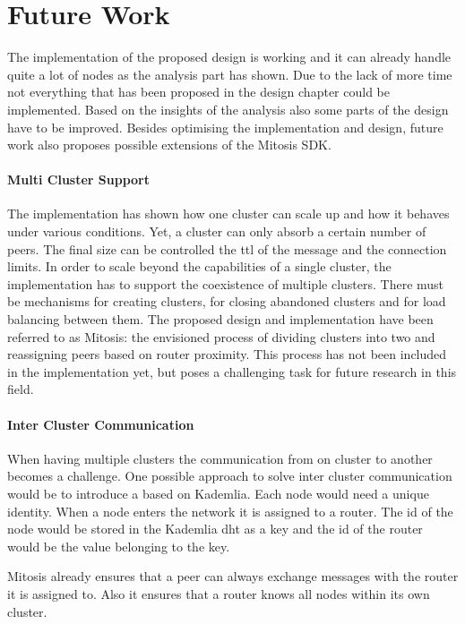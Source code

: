 \section{Future Work}
The implementation of the proposed design is working and it can already handle quite a lot of nodes as the analysis part has shown. Due to the lack of more time not everything that has been proposed in the design chapter could be implemented. Based on the insights of the analysis also some parts of the design have to be improved.
Besides optimising the implementation and design, future work also proposes possible extensions of the \gls{Mitosis} SDK.

\paragraph{Multi Cluster Support}
The implementation has shown how one cluster can scale up and how it behaves under various conditions. Yet, a cluster can only absorb a certain number of peers. The final size can be controlled the \gls{ttl} of the \routerAlive message and the connection limits. In order to scale beyond the capabilities of a single cluster, the implementation has to support the coexistence of multiple clusters. There must be mechanisms for creating clusters, for closing abandoned clusters and for load balancing between them. The proposed design and implementation have been referred to as \gls{Mitosis}: the envisioned process of dividing clusters into two and reassigning peers based on router proximity. This process has not been included in the implementation yet, but poses a challenging task for future research in this field.

\paragraph{Inter Cluster Communication}
When having multiple clusters the communication from on cluster to another becomes a challenge. One possible approach to solve inter cluster communication would be to introduce a  based on Kademlia. Each node would need a unique identity. When a node enters the network it is assigned to a router. The id of the node would be stored in the Kademlia \gls{dht} as a key and the id of the router would be the value belonging to the key. 

Mitosis already ensures that a peer can always exchange messages with the router it is assigned to. Also it ensures that a router knows all nodes within its own cluster. 

